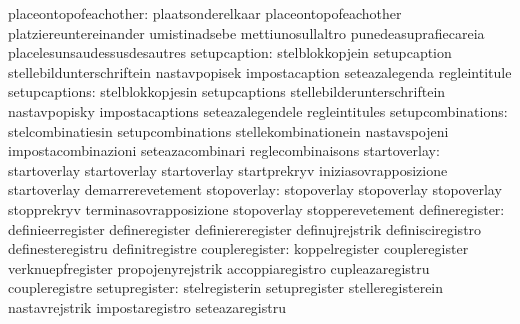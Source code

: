            placeontopofeachother: plaatsonderelkaar                placeontopofeachother
                                  platziereuntereinander           umistinadsebe
                                  mettiunosullaltro                punedeasuprafiecareia
                                  placelesunsaudessusdesautres
                    setupcaption: stelblokkopjein                  setupcaption
                                  stellebildunterschriftein        nastavpopisek
                                  impostacaption                   seteazalegenda
                                  regleintitule
                   setupcaptions: stelblokkopjesin                 setupcaptions
                                  stellebilderunterschriftein      nastavpopisky
                                  impostacaptions                  seteazalegendele
                                  regleintitules
               setupcombinations: stelcombinatiesin                setupcombinations
                                  stellekombinationein             nastavspojeni
                                  impostacombinazioni              seteazacombinari
                                  reglecombinaisons
                    startoverlay: startoverlay                     startoverlay
                                  startoverlay                     startprekryv
                                  iniziasovrapposizione            startoverlay
                                  demarrerevetement
                     stopoverlay: stopoverlay                      stopoverlay
                                  stopoverlay                      stopprekryv
                                  terminasovrapposizione           stopoverlay
                                  stopperevetement
                  defineregister: definieerregister                defineregister
                                  definiereregister                definujrejstrik
                                  definisciregistro                definesteregistru
                                  definitregistre
                  coupleregister: koppelregister                   coupleregister
                                  verknuepfregister                propojenyrejstrik
                                  accoppiaregistro                 cupleazaregistru
                                  coupleregistre
                   setupregister: stelregisterin                   setupregister
                                  stelleregisterein                nastavrejstrik
                                  impostaregistro                  seteazaregistru
